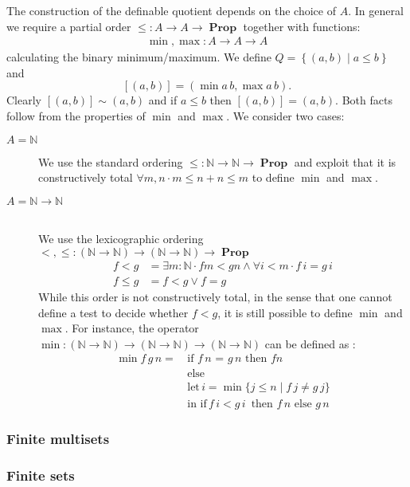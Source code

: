 \documentclass[envcountsame]{llncs}
\newcommand{\N}{\mathbb{N}}
\providecommand{\set}  [1]{\left\{#1\right\}}
\DeclareMathOperator{\Prop}{\mathbf{Prop}}
\begin{document}
The construction of the definable quotient depends on the choice of $A$. In general we
require a partial order $\leq : A \to A \to \Prop$ together with functions:
\begin{align*}
\min, \max : A \to A \to A
\end{align*}
calculating the binary minimum/maximum. We define $Q = \set{(a , b) \mid  a \leq b}$ and 
\[ [(a,b)] = (\min a\, b, \max a \,b).\]
Clearly $[(a,b)] \sim (a,b)$ and if $a\leq b$ then $[(a,b)]=(a,b)$. Both facts follow from
 the properties of $\min$ and $\max$. We consider two cases:
\begin{description}
\item[$A = \N$] \hfill 

We use the standard ordering $\leq : \N \to \N \to \Prop$ and exploit
that it is constructively total $\forall m ,n\cdot m \leq n + n \leq m$ to define $\min$ and 
$\max$.  
\item[$A=\N\to\N$] \hfill\\
We use the lexicographic ordering ${<},{\leq}:(\N \to \N) \to (\N\to\N)\to\Prop$
\begin{align*}
f < g & = \exists m:\N \cdot f m < g n \wedge \forall i<m\cdot f\,i = g \,i\\
f \leq g &= f < g \vee f=g
\end{align*}
While this order is not constructively total, in the sense that one cannot define a test to decide whether $f<g$, it is still possible to define $\min$ and $\max$. 
For instance, the operator $\min : (\N \to \N) \to (\N\to\N) \to (\N \to \N)$ can be defined as : 
\begin{align*}
 \min f\,g\,n =\,&\text{if $f \,n$ = $g\,n$ then $f n$}\\
                 &\text{else }\\
                 &\text{let}\,i = \min \{ j \leq n \mid f\,j \not= g\,j \}\\ 
                 &\text{in }\text{if}\, f\,i< g\,i\,\text{ then } f\,n \text{ else } g\,n   
\end{align*} 
\end{description}


\subsubsection*{Finite multisets}

\subsubsection*{Finite sets}
\end{document}
